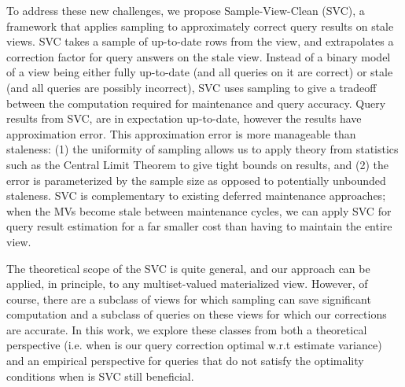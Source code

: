 To address these new challenges, we propose Sample-View-Clean (SVC), a framework that applies sampling to approximately correct query results on stale views.
SVC takes a sample of up-to-date rows from the view, and extrapolates a correction factor for query answers on the stale view.
Instead of a binary model of a view being either fully up-to-date (and all queries on it are correct) or stale (and all queries are possibly incorrect), SVC uses sampling to give a tradeoff between the computation required for maintenance and query accuracy.
Query results from SVC, are in expectation up-to-date, however the results have approximation error.
This approximation error is more manageable than staleness: (1) the uniformity of sampling allows us to apply theory from statistics such as the Central Limit Theorem to give tight bounds on results, and (2) the error is parameterized by the sample size as opposed to potentially unbounded staleness.
SVC is complementary to existing deferred maintenance approaches; when the MVs become stale between maintenance cycles, we can apply SVC for query result estimation for a far smaller cost than having to maintain the entire view.


The theoretical scope of the SVC is quite general, and our approach can be applied, in principle, to any multiset-valued materialized view.
However, of course, there are a subclass of views for which sampling can save significant computation and a subclass of queries on these views for which our corrections are accurate.
In this work, we explore these classes from both a theoretical perspective (i.e. when is our query correction optimal w.r.t estimate variance) and an empirical perspective for queries that do not satisfy the optimality conditions when is SVC still beneficial.


